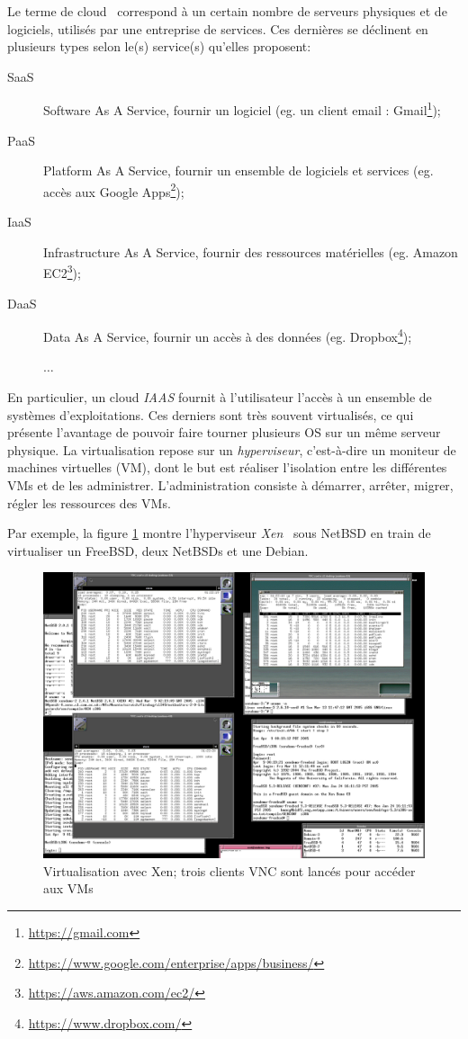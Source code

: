 \documentclass[a4paper]{article}
\begin{document}
Le terme de \og cloud \fg\ correspond à un certain nombre de serveurs
physiques et de logiciels, utilisés par une entreprise de services. Ces
dernières se déclinent en plusieurs types selon le(s) service(s) qu'elles
proposent:
\begin{description}
	\item[SaaS] Software As A Service, fournir un logiciel
		(eg. un client email : Gmail\footnote{\url{https://gmail.com}});
	\item[PaaS] Platform As A Service, fournir un ensemble de logiciels et services
		(eg. accès aux Google Apps\footnote{\url{https://www.google.com/enterprise/apps/business/}});
	\item[IaaS] Infrastructure As A Service, fournir des ressources matérielles
		(eg. Amazon EC2\footnote{\url{https://aws.amazon.com/ec2/}});
	\item[DaaS] Data As A Service, fournir un accès à des données
		(eg. Dropbox\footnote{\url{https://www.dropbox.com/}});
	\item[] $\ldots$
\end{description}

En particulier, un cloud \textit{IAAS} fournit à l'utilisateur l'accès
à un ensemble de systèmes d'exploitations. Ces derniers sont très
souvent virtualisés, ce qui présente l'avantage de pouvoir faire tourner
plusieurs OS sur un même serveur physique. La virtualisation repose sur
un \textit{hyperviseur}, c'est-à-dire un moniteur de machines virtuelles (VM), dont
le but est réaliser l'isolation entre les différentes VMs et de les administrer.
L'administration consiste à démarrer, arrêter, migrer, régler les ressources des
VMs.

Par exemple, la figure \ref{hubertfxen} montre l'hyperviseur \textit{Xen}~\cite{barham2003xen}
sous NetBSD en train de virtualiser un FreeBSD, deux NetBSDs et une Debian.
\begin{figure}[!ht]
	\centering
	\includegraphics[scale=.17]{imgs/hubertf-xen.png}
	\caption{\label{hubertfxen} Virtualisation avec Xen; trois clients
		VNC \protect\footnotemark sont lancés pour accéder aux VMs}
\end{figure}
\end{document}
